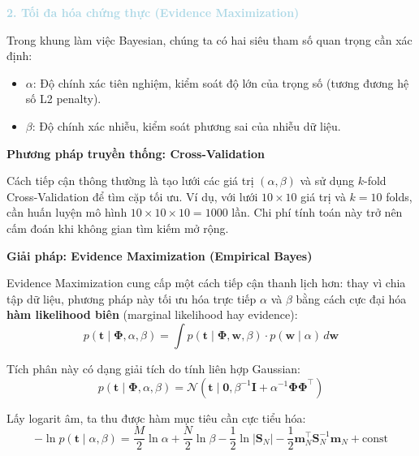 \vspace{0.5em}
\textcolor{lightblue}{\textbf{2. Tối đa hóa chứng thực (Evidence Maximization)}}
\vspace{0.5em}

Trong khung làm việc Bayesian, chúng ta có hai siêu tham số quan trọng cần xác định:
\begin{itemize} [labelsep=10pt, leftmargin=2cm]
    \item $\alpha$: Độ chính xác tiên nghiệm, kiểm soát độ lớn của trọng số (tương đương hệ số L2 penalty).
    \item $\beta$: Độ chính xác nhiễu, kiểm soát phương sai của nhiễu dữ liệu.
\end{itemize}

\textbf{Phương pháp truyền thống: Cross-Validation}

Cách tiếp cận thông thường là tạo lưới các giá trị $(\alpha, \beta)$ và sử dụng $k$-fold Cross-Validation để tìm cặp tối ưu. Ví dụ, với lưới $10 \times 10$ giá trị và $k=10$ folds, cần huấn luyện mô hình $10 \times 10 \times 10 = 1000$ lần. Chi phí tính toán này trở nên cấm đoán khi không gian tìm kiếm mở rộng.

\textbf{Giải pháp: Evidence Maximization (Empirical Bayes)}

Evidence Maximization cung cấp một cách tiếp cận thanh lịch hơn: thay vì chia tập dữ liệu, phương pháp này tối ưu hóa trực tiếp $\alpha$ và $\beta$ bằng cách cực đại hóa \textbf{hàm likelihood biên} (marginal likelihood hay evidence):
\begin{equation}
p(\mathbf{t} \mid \mathbf{\Phi}, \alpha, \beta) = \int p(\mathbf{t} \mid \mathbf{\Phi}, \mathbf{w}, \beta) \cdot p(\mathbf{w} \mid \alpha) \, d\mathbf{w}
\label{eq:evidence}
\end{equation}

Tích phân này có dạng giải tích do tính liên hợp Gaussian:
\begin{equation}
p(\mathbf{t} \mid \mathbf{\Phi}, \alpha, \beta) = \mathcal{N}(\mathbf{t} \mid \mathbf{0}, \beta^{-1}\mathbf{I} + \alpha^{-1}\mathbf{\Phi}\mathbf{\Phi}^{\top})
\end{equation}

Lấy logarit âm, ta thu được hàm mục tiêu cần cực tiểu hóa:
\begin{equation}
-\ln p(\mathbf{t} \mid \alpha, \beta) = \frac{M}{2}\ln\alpha + \frac{N}{2}\ln\beta - \frac{1}{2}\ln|\mathbf{S}_N| - \frac{1}{2}\mathbf{m}_N^{\top}\mathbf{S}_N^{-1}\mathbf{m}_N + \text{const}
\label{eq:neg_log_evidence}
\end{equation}

